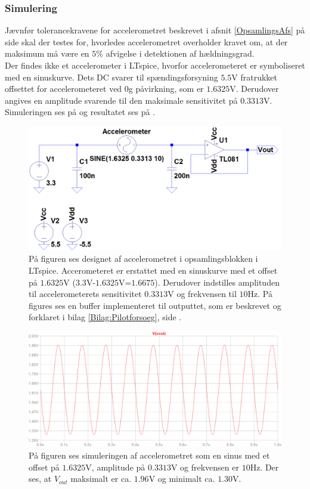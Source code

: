 \subsubsection{Simulering}
Jævnfør tolerancekravene for accelerometret beskrevet i afsnit \ref{OpsamlingsAfs} på side \pageref{OpsamlingsAfs} skal der testes for, hvorledes accelerometret overholder kravet om, at der maksimum må være en $5\%$ afvigelse i detektionen af hældningsgrad. \\
Der findes ikke et accelerometer i LTspice, hvorfor accelerometeret er symboliseret med en sinuskurve. Dets DC svarer til spændingsforsyning $5.5$V fratrukket offsettet for accelerometeret ved $0$g påvirkning, som er $1.6325$V. Derudover angives en amplitude svarende til den maksimale sensitivitet på $0.3313$V. Simuleringen ses på  og resultatet ses på .
\begin{figure}[H]
	\centering
	\includegraphics[scale=.4]{figures/cProblemloesning/Acc_Simulering1.PNG}
	\caption{På figuren ses designet af accelerometret i opsamlingsblokken i LTspice. Accerometeret er erstattet med en sinuskurve med et offset på $1.6325$V ($3.3$V-$1.6325$V=$1.6675$). Derudover indstilles amplituden til accelerometerets sensitivitet $0.3313$V og frekvensen til $10$Hz. På figures ses en buffer implementeret til outputtet, som er beskrevet og forklaret i bilag \ref{Bilag:Pilotforsoeg}, side \pageref{Bilag:Pilotforsoeg}.}
	\label{fig:acc_simulering}
\end{figure}
\begin{figure}[H]
	\centering
	\includegraphics[scale=.38]{figures/cProblemloesning/Acc_Simulering2.PNG}
	\caption{På figuren ses simuleringen af accelerometret som en sinus med et offset på $1.6325$V, amplitude på $0.3313$V og frekvensen er $10$Hz. Der ses, at $V_{out}$ maksimalt er ca. $1.96$V og minimalt ca. $1.30$V.}
	\label{fig:acc_simulering_resultat}
\end{figure}

